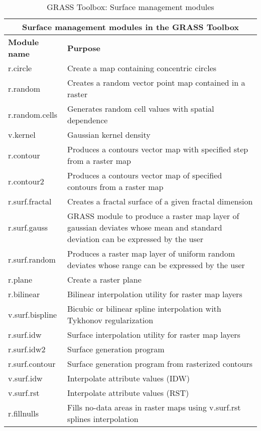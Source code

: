 \begin{table}[H]
\centering
 \begin{tabular}{|p{4cm}|p{10cm}|}
  \hline \multicolumn{2}{|c|}{\textbf{Surface management modules in the GRASS
  Toolbox}} \\
  \hline \textbf{Module name} & \textbf{Purpose} \\
  \hline r.circle & Create a map containing concentric circles \\
  \hline r.random & Creates a random vector point map contained in a raster \\
  \hline r.random.cells & Generates random cell values with spatial
  dependence \\
  \hline v.kernel & Gaussian kernel density \\
  \hline r.contour & Produces a contours vector map with specified step from
  a raster map\\
  \hline r.contour2 & Produces a contours vector map of specified contours
  from a raster map \\
  \hline r.surf.fractal & Creates a fractal surface of a given fractal
  dimension\\
  \hline r.surf.gauss & GRASS module to produce a raster map layer of
  gaussian deviates whose mean and standard deviation can be expressed by the
  user \\
  \hline r.surf.random & Produces a raster map layer of uniform random
  deviates whose range can be expressed by the user \\
  \hline r.plane & Create a raster plane \\
  \hline r.bilinear & Bilinear interpolation utility for raster map layers \\
  \hline v.surf.bispline & Bicubic or bilinear spline interpolation with
  Tykhonov regularization\\
  \hline r.surf.idw & Surface interpolation utility for raster map layers\\
  \hline r.surf.idw2 & Surface generation program\\
  \hline r.surf.contour & Surface generation program from rasterized contours \\
  \hline v.surf.idw & Interpolate attribute values (IDW) \\
  \hline v.surf.rst & Interpolate attribute values (RST) \\
  \hline r.fillnulls & Fills no-data areas in raster maps using v.surf.rst
  splines interpolation \\
\hline
\end{tabular}
\caption{GRASS Toolbox: Surface management modules}
\end{table}

